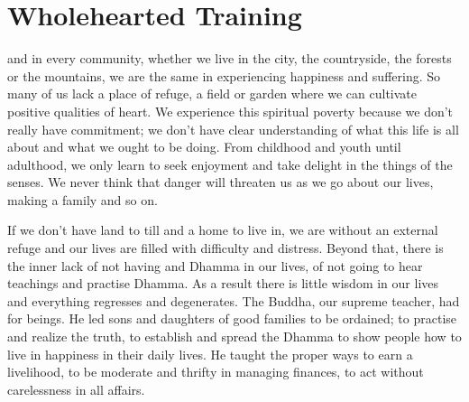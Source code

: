 
\chapter{Wholehearted Training}

 and in every community, whether we live in the city, the countryside, the forests or the mountains, we are the same in experiencing happiness and suffering. So many of us lack a place of refuge, a field or garden where we can cultivate positive qualities of heart. We experience this spiritual poverty because we don't really have commitment; we don't have clear understanding of what this life is all about and what we ought to be doing. From childhood and youth until adulthood, we only learn to seek enjoyment and take delight in the things of the senses. We never think that danger will threaten us as we go about our lives, making a family and so on. 

If we don't have land to till and a home to live in, we are without an external refuge and our lives are filled with difficulty and distress. Beyond that, there is the inner lack of not having  and Dhamma in our lives, of not going to hear teachings and practise Dhamma. As a result there is little wisdom in our lives and everything regresses and degenerates. The Buddha, our supreme teacher, had  for beings. He led sons and daughters of good families to be ordained; to practise and realize the truth, to establish and spread the Dhamma to show people how to live in happiness in their daily lives. He taught the proper ways to earn a livelihood, to be moderate and thrifty in managing finances, to act without carelessness in all affairs. 


